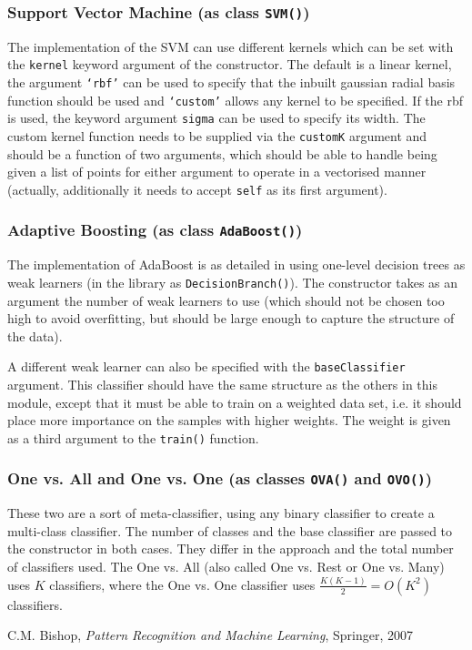 \documentclass[a4paper, 12pt]{article}
\begin{document}
\subsubsection{Support Vector Machine (as class \texttt{SVM()})}
The implementation of the SVM can use different kernels which can be set with the \texttt{kernel} keyword argument of the constructor. The default is a linear kernel, the argument \texttt{`rbf'} can be used to specify that the inbuilt gaussian radial basis function should be used and \texttt{`custom'} allows any kernel to be specified. If the rbf is used, the keyword argument \texttt{sigma} can be used to specify its width. The custom kernel function needs to be supplied via the \texttt{customK} argument and should be a function of two arguments, which should be able to handle being given a list of points for either argument to operate in a vectorised manner (actually, additionally it needs to accept \texttt{self} as its first argument).

\subsubsection{Adaptive Boosting (as class \texttt{AdaBoost()})}
The implementation of AdaBoost is as detailed in \cite{PRML} using one-level decision trees as weak learners (in the library as \texttt{DecisionBranch()}). The constructor takes as an argument the number of weak learners to use (which should not be chosen too high to avoid overfitting, but should be large enough to capture the structure of the data).

A different weak learner can also be specified with the \texttt{baseClassifier} argument. This classifier should have the same structure as the others in this module, except that it must be able to train on a weighted data set, i.e. it should place more importance on the samples with higher weights. The weight is given as a third argument to the \texttt{train()} function.

\subsubsection{One vs. All and One vs. One (as classes \texttt{OVA()} and \texttt{OVO()})}
These two are a sort of meta-classifier, using any binary classifier to create a multi-class classifier. The number of classes and the base classifier are passed to the constructor in both cases. They differ in the approach and the total number of classifiers used. The One vs. All (also called One vs. Rest or One vs. Many) uses $K$ classifiers, where the One vs. One classifier uses $\frac{K(K-1)}{2} = O(K^2)$ classifiers.

\begin{thebibliography}{9}
 C.M. Bishop, \emph{Pattern Recognition and Machine Learning}, Springer, 2007
\end{thebibliography}
\end{document}
